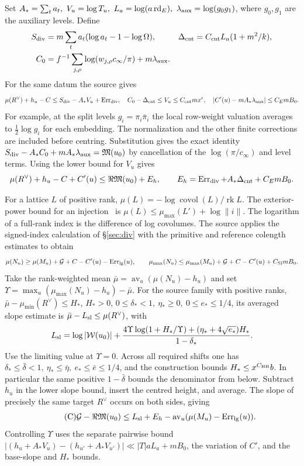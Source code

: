 \documentclass[letterpaper,11pt]{article}
\newcommand{\av}{\operatorname{av}}
\newcommand{\Err}{\operatorname{Err}}
\newcommand{\Msum}{\mathfrak M}
\newcommand{\Gain}{\mathcal G}
\begin{document}
Set \(A_*=\sum_t a_t,\ V_u=\log T_u,\ L_a=\log(a\,{\rm rd}_E),\ \lambda_{\rm aux}=\log(g_0g_1)\), where \(g_0,g_1\) are the auxiliary levels. Define
\begin{align*}
 S_{\rm div}&=m\sum_ta_t(\log a_t-1-\log\Omega),&
 \Delta_{\rm cnt}&=C_{\rm cnt}L_a(1+m^2/k),\\
 C_0&= f^{-1}\sum_{j,\rho}\log(w_{j,\rho}c_\infty/\pi)+m\lambda_{\rm aux}.
\end{align*}
For the same datum the source gives
\[
 \mu(R^\vee)+h_u-C\le S_{\rm div}-A_*V_u+\Err_{\rm div},\quad
 C_0-\Delta_{\rm cnt}\le V_u\le C_{\rm cnt}mx^\epsilon,\quad
 |C'(u)-mA_*\lambda_{\rm aux}|\le C_E m B_0 .
\]
For example, at the split levels \(g_i=\pi_i\bar\pi_i\) the local row-weight valuation averages to \(\frac12\log g_i\) for each embedding. The normalization and the other finite corrections are included before centring. Substitution gives the exact identity \(S_{\rm div}-A_*C_0+mA_*\lambda_{\rm aux}=\Msum(u_0)\) by cancellation of the \(\log(\pi/c_\infty)\) and level terms. Using the lower bound for \(V_u\) gives
\[
 \mu(R^\vee)+h_u-C+C'(u)\le \Re\Msum(u_0)+E_h,\qquad
 E_h=\Err_{\rm div}+A_*\Delta_{\rm cnt}+C_E m B_0 .
\]

For a lattice \(L\) of positive rank, \(\mu(L)=-\log\operatorname{covol}(L)/\operatorname{rk} L\). The exterior-power bound for an injection~\cite{bost} is \(\mu(L)\le\mu_{\max}(L')+\log\|i\|\). The logarithm of a full-rank index is the difference of log covolumes. The source applies the signed-index calculation of \S\ref{sec:div} with the primitive and reference colength estimates to obtain
\[
 \mu(N_u)\ge\mu(M_u)+\Gain+C-C'(u)-\Err_{\rm lg}(u),\qquad
 \mu_{\max}(N_u)\le\mu_{\max}(M_u)+\Gain+C-C'(u)+C_{\rm Sl}mB_0 .
\]
Take the rank-weighted mean \(\bar\mu=\av_u(\mu(N_u)-h_u)\) and set \(\Upsilon=\max_u(\mu_{\max}(N_u)-h_u)-\bar\mu\). For the source family with positive ranks, \(\bar\mu-\mu_{\min}(R^\vee)\le H_*\), \(H_*>0\), \(0\le\delta_*<1,\ \eta_*\ge0,\ 0\le e_*\le1/4\), its averaged slope estimate is \(\bar\mu-L_{\rm sl}\le\mu(R^\vee)\), with
\[
 L_{\rm sl}=\log|\mathcal W(u_0)|+
 \frac{4\Upsilon\log(1+H_*/\Upsilon)+(\eta_*+4\sqrt{e_*})H_*}{1-\delta_*}.
\]
Use the limiting value at \(\Upsilon=0\). Across all required shifts one has \(\delta_*\le\bar\delta<1,\ \eta_*\le\bar\eta,\ e_*\le\bar e\le1/4\), and the construction bounds \(H_*\le x^{C_{\rm HH}}b\). In particular the same positive \(1-\bar\delta\) bounds the denominator from below. Subtract \(h_u\) in the lower slope bound, insert the centred height, and average. The slope of precisely the same target \(R^\vee\) occurs on both sides, giving
\begin{equation}\tag{C}\label{eq:C}
 \Gain-\Re\Msum(u_0)\le L_{\rm sl}+E_h-\av_u(\mu(M_u)-\Err_{\rm lg}(u)).
\end{equation}
Controlling \(\Upsilon\) uses the separate pairwise bound
\(\left|(h_u+A_*V_u)-(h_{u'}+A_*V_{u'})\right|\ll |T|aL_a+mB_0\),
the variation of \(C'\), and the base-slope and \(H_*\) bounds.
\end{document}

